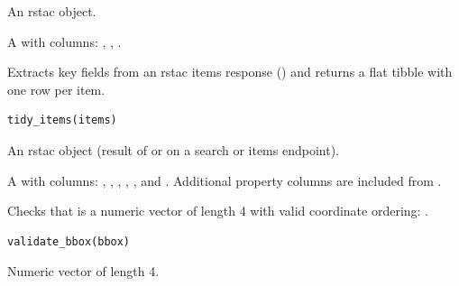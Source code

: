 \documentclass[a4paper]{book}
\begin{document}
%
\begin{Arguments}
\begin{ldescription}
\item[\code{collections}] An rstac  object.
\end{ldescription}
\end{Arguments}
%
\begin{Value}
A  with columns: , , .
\end{Value}
%
\begin{Description}
Extracts key fields from an rstac items response () and returns
a flat tibble with one row per item.
\end{Description}
%
\begin{Usage}
\begin{verbatim}
tidy_items(items)
\end{verbatim}
\end{Usage}
%
\begin{Arguments}
\begin{ldescription}
\item[\code{items}] An rstac  object (result of 
or  on a search or items endpoint).
\end{ldescription}
\end{Arguments}
%
\begin{Value}
A  with columns: , , ,
, , and . Additional property columns are included
from .
\end{Value}
%
\begin{Description}
Checks that  is a numeric vector of length 4 with valid coordinate
ordering: .
\end{Description}
%
\begin{Usage}
\begin{verbatim}
validate_bbox(bbox)
\end{verbatim}
\end{Usage}
%
\begin{Arguments}
\begin{ldescription}
\item[\code{bbox}] Numeric vector of length 4.
\end{ldescription}
\end{Arguments}
\end{document}
